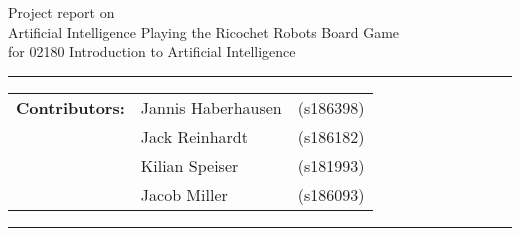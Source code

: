 \documentclass[a4paper,10pt]{article}
\begin{document}
\begin{center}
Project report on\\
\vspace{0.5cm}
{{\Large \sc Artificial Intelligence Playing the Ricochet Robots Board Game}} \\
\vspace{0.5cm} for 02180 Introduction to Artificial Intelligence
\end{center}
\rule{\textwidth}{0.5pt}
\begin{description}
\item\begin{tabular}{rll}
    \textbf{Contributors:}  & Jannis Haberhausen  & (s186398) \\
                            & Jack Reinhardt      & (s186182) \\
                            & Kilian Speiser      & (s181993) \\
                            & Jacob Miller        & (s186093) \\
\end{tabular}
\end{description}
\rule{\textwidth}{1pt}

\tableofcontents
\thispagestyle{empty}
\newpage


\end{document}
